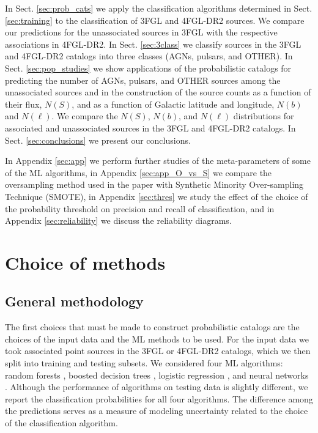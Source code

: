 \documentclass[referee]{aa} %
\newcommand{\lb}{\label}
\begin{document}
In Sect. \ref{sec:prob_cats} we apply the classification algorithms determined in Sect. \ref{sec:training} to the classification of 3FGL and 4FGL-DR2 sources.
We compare our predictions for the unassociated sources in 3FGL with the respective associations in 4FGL-DR2.
In Sect. \ref{sec:3class} we classify sources in the 3FGL and 4FGL-DR2 catalogs into three classes (AGNs, pulsars, and OTHER).
In Sect. \ref{sec:pop_studies} we show applications of the probabilistic catalogs for predicting the number of AGNs, pulsars, and OTHER sources among the unassociated sources and in the construction of the source counts as a function of their flux, $N(S)$, and as a function of 
Galactic latitude and longitude, $N(b)$ and $N(\ell)$.
We compare the $N(S)$, $N(b)$, and $N(\ell)$ distributions for associated and unassociated sources in the 3FGL and 4FGL-DR2 catalogs.
In Sect. \ref{sec:conclusions} we present our conclusions.

In Appendix \ref{sec:app} we perform further studies of the meta-parameters of some of the ML algorithms, 
in Appendix \ref{sec:app_O_vs_S} we compare the oversampling method used in the paper with Synthetic Minority Over-sampling Technique (SMOTE),
in Appendix \ref{sec:thres} we study the effect of the choice of the probability threshold on precision and recall of classification,
and in Appendix \ref{sec:reliability} we discuss the reliability diagrams.


\section{Choice of methods}
\lb{sec:methods}


\subsection{General methodology}


The first choices that must be made to construct probabilistic catalogs are the choices of the input data and the ML methods to be used.
For the input data we took associated point sources in the 3FGL or 4FGL-DR2 catalogs, which we then split into training and testing subsets.
We considered four ML algorithms: random forests \citep[RF;][]{709601, Breiman:2001hzm}, 
boosted decision trees \citep[BDT;][]{friedman2001},  
logistic regression \citep[LR;][]{cox1958}, 
and neural networks \citep[NN;][]{Hopfield:1982pe}.
Although the performance of algorithms on testing data is slightly different, 
we report the classification probabilities for all four algorithms.
The difference among the predictions serves as a measure of modeling uncertainty related 
to the choice of the classification algorithm.
\end{document}
